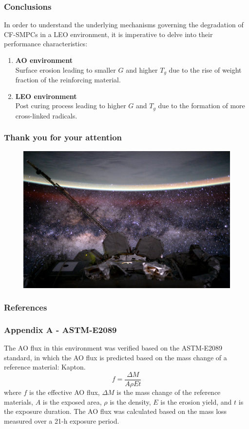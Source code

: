 \documentclass[10pt]{beamer}
\begin{document}
\begin{frame}[label=conclusions]
\frametitle{Conclusions}
In order to understand the underlying mechanisms governing the degradation of CF-SMPCs in a LEO environment, it is imperative to delve into their performance characteristics:
\begin{enumerate}
\item \textbf{AO environment}\\
Surface erosion leading to smaller $G$ and higher $T_g$ due to the rise of weight fraction of the reinforcing material. 

\item \textbf{LEO environment}\\
Post curing process leading to higher $G$ and $T_g$ due to the formation of more cross-linked radicals.
\end{enumerate}
\end{frame}

\begin{frame}
\frametitle{Thank you for your attention}
\begin{figure}[H]
\centering
\includegraphics[width=\linewidth]{figures/immagine_finale}
\label{fig:immaginefinale}
\end{figure}

\end{frame}

\begin{frame}
\frametitle{References}
\printbibliography
\end{frame}



\begin{frame}
\frametitle{Appendix A - ASTM-E2089}
The AO flux in this environment was verified
based on the ASTM-E2089 standard, in which the AO flux is predicted based on the
mass change of a reference material: Kapton. 
\[f = \dfrac{\Delta M}{A\rho Et}\]
where $f$ is the effective AO flux, $\Delta M$ is the mass change of the reference materials, $A$ is the
exposed area, $\rho$ is the density, $E$ is the erosion yield, and $t$ is the exposure duration. The
AO flux was calculated based on the mass loss measured over a 21-h exposure period.
\end{frame}
\end{document}
